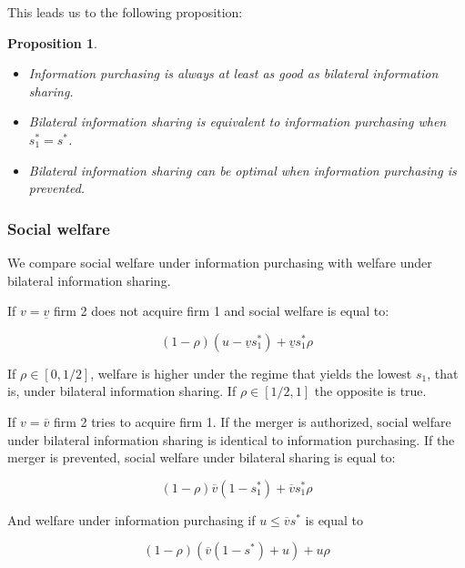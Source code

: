 \documentclass[a4paper,leqno]{article}%
\newtheorem{prop}{Proposition}
\newcommand{\uv}{\underline{v}}
\newcommand{\ov}{\overline{v}}
\begin{document}
\medskip

This leads us to the following proposition:

\begin{prop}~~\label{prop:1bil3}


\begin{itemize}
    \item Information purchasing is always at least as good as bilateral information sharing.  
    \item Bilateral information sharing is equivalent to information purchasing when $s_1^*=s^*$.
    \item Bilateral information sharing can be optimal when information purchasing is prevented.
\end{itemize}

\end{prop}

\medskip

\subsubsection{Social welfare}

\medskip

We compare social welfare under information purchasing with welfare under bilateral information sharing. 

\medskip

If $v=\uv$ firm 2 does not acquire firm 1 and social welfare is equal to:

\[
(1-\rho) (u-\uv s_1^*)+\uv s_1^*\rho
\]

\medskip

If $\rho\in[0,1/2]$, welfare is higher under the regime that yields the lowest $s_1$, that is, under bilateral information sharing. If $\rho\in[1/2,1]$ the opposite is true.

\medskip

If $v=\ov$ firm 2 tries to acquire firm 1. If the merger is authorized, social welfare under bilateral information sharing is identical to information purchasing. If the merger is prevented, social welfare under bilateral sharing is equal to:

\medskip

\[
(1-\rho) \ov (1-s_1^*)+\ov s_1^*\rho
\]

\medskip

And welfare under information purchasing if $u\leq \ov s^*$ is equal to

\medskip

\[
(1-\rho) (\ov (1-s^*)+u)+u\rho
\]
\end{document}
